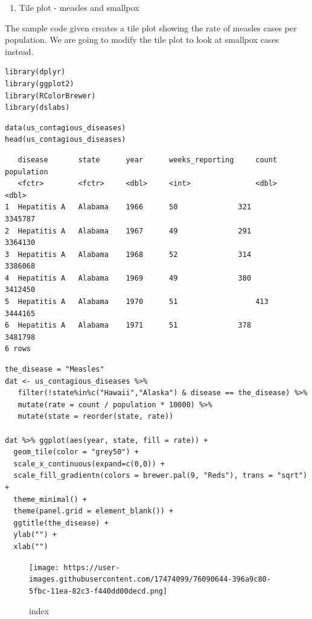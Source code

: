 \documentclass[
]{article}
\providecommand{\tightlist}{%
  \setlength{\itemsep}{0pt}\setlength{\parskip}{0pt}}
\begin{document}
\begin{enumerate}
\def\labelenumi{\arabic{enumi}.}
\tightlist
\item
  Tile plot - measles and smallpox
\end{enumerate}

The sample code given creates a tile plot showing the rate of measles
cases per population. We are going to modify the tile plot to look at
smallpox cases instead.

\begin{verbatim}
library(dplyr)
library(ggplot2)
library(RColorBrewer)
library(dslabs)
\end{verbatim}

\begin{verbatim}
data(us_contagious_diseases)
head(us_contagious_diseases)
\end{verbatim}

\begin{verbatim}
   disease       state      year      weeks_reporting     count      population
   <fctr>        <fctr>     <dbl>     <int>               <dbl>      <dbl>
1  Hepatitis A   Alabama    1966      50              321        3345787
2  Hepatitis A   Alabama    1967      49              291        3364130
3  Hepatitis A   Alabama    1968      52              314        3386068
4  Hepatitis A   Alabama    1969      49              380        3412450
5  Hepatitis A   Alabama    1970      51                  413        3444165
6  Hepatitis A   Alabama    1971      51              378        3481798
6 rows
\end{verbatim}

\begin{verbatim}
the_disease = "Measles"
dat <- us_contagious_diseases %>% 
   filter(!state%in%c("Hawaii","Alaska") & disease == the_disease) %>% 
   mutate(rate = count / population * 10000) %>% 
   mutate(state = reorder(state, rate))

dat %>% ggplot(aes(year, state, fill = rate)) + 
  geom_tile(color = "grey50") + 
  scale_x_continuous(expand=c(0,0)) + 
  scale_fill_gradientn(colors = brewer.pal(9, "Reds"), trans = "sqrt") + 
  theme_minimal() + 
  theme(panel.grid = element_blank()) + 
  ggtitle(the_disease) + 
  ylab("") + 
  xlab("")
\end{verbatim}

\begin{figure}
\centering
\texttt{[image: https://user-images.githubusercontent.com/17474099/76090644-396a9c80-5fbc-11ea-82c3-f440dd00decd.png]}
\caption{index}
\end{figure}
\end{document}
